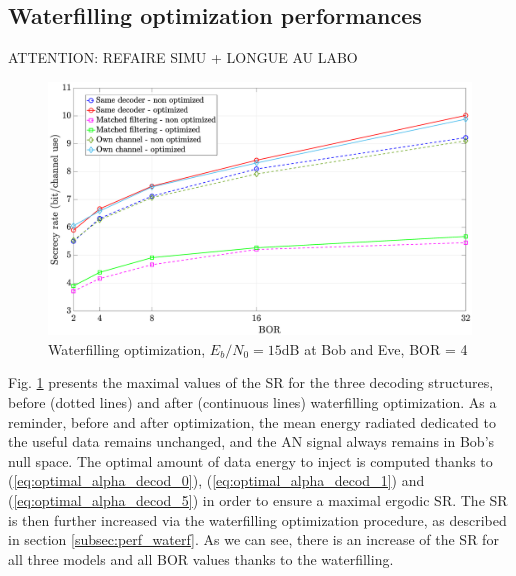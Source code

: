 \documentclass[journal,comsoc]{IEEEtran}
\let\MYoriglatexcaption\caption
\renewcommand{\caption}[2][\relax]{\MYoriglatexcaption[#2]{#2}}
\begin{document}
\subsection{Waterfilling optimization performances}
{\color{red}  ATTENTION: REFAIRE SIMU + LONGUE AU LABO}

\begin{figure}[h!t]
	\centering
	\includegraphics[width=1\linewidth]{graphs/SISO_no_corr_waterfilling.eps}
	\caption{Waterfilling optimization, $E_b/N_0 = 15$dB at Bob and Eve, BOR = 4}
	\label{fig_waterfilling_opt}
\end{figure}
Fig. \ref{fig_waterfilling_opt} presents the maximal values of the SR for the three decoding structures, before (dotted lines) and after (continuous lines) waterfilling optimization. As a reminder, before and after optimization, the mean energy radiated dedicated to the useful data remains unchanged, and the AN signal always remains in Bob's null space. The optimal amount of data energy to inject is computed thanks to (\ref{eq:optimal_alpha_decod_0}), (\ref{eq:optimal_alpha_decod_1}) and (\ref{eq:optimal_alpha_decod_5}) in order to ensure a maximal ergodic SR. The SR is then further increased via the waterfilling optimization procedure, as described in section \ref{subsec:perf_waterf}. As we can see, there is an increase of the SR for all three models and all BOR values thanks to the waterfilling. 



\end{document}
